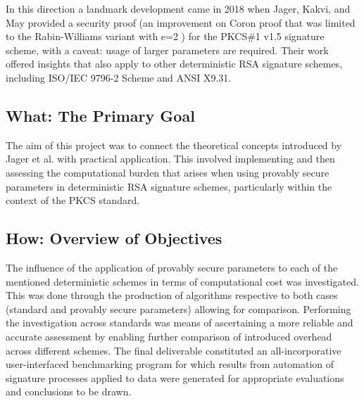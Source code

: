 \documentclass[]{final_report}
\theoremstyle{definition}
\begin{document}
In this direction a landmark development came in 2018 when Jager, Kakvi, and May \cite{jager2018security} provided a security proof (an improvement on Coron proof that was limited to the Rabin-Williams variant with e=2 \cite{coron2002security}) for the PKCS\#1 v1.5 signature scheme, with a caveat: usage of larger parameters are required. Their work offered insights that also apply to other deterministic RSA signature schemes, including ISO/IEC 9796-2 Scheme and ANSI X9.31.

\subsection{What: The Primary Goal}
The aim of this project was to connect the theoretical concepts introduced by Jager et al. \cite{jager2018security} with practical application. This involved implementing and then assessing the computational burden that arises when using provably secure parameters in deterministic RSA signature schemes, particularly within the context of the PKCS standard.

\subsection{How: Overview of Objectives}
The influence of the application of provably secure parameters to each of the mentioned deterministic schemes in terms of computational cost was investigated. This was done through the production of algorithms respective to both cases (standard and provably secure parameters) allowing for comparison. Performing the investigation across standards was means of ascertaining a more reliable and accurate assessment by enabling further comparison of introduced overhead across different schemes. The final deliverable constituted an all-incorporative user-interfaced benchmarking program for which results from automation of signature processes applied to data were generated for appropriate evaluations and conclusions to be drawn.
\end{document}

